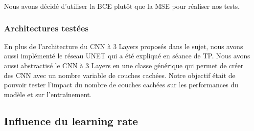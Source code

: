 \documentclass{name}
\begin{document}
Nous avons décidé d'utiliser la BCE plutôt que la MSE pour réaliser nos tests.

\subsubsection{Architectures testées}
En plus de l'architecture du CNN à 3 Layers proposés dans le sujet, nous avons aussi implémenté le réseau UNET qui a été expliqué en séance de TP.
Nous avons aussi abstractisé le CNN à 3 Layers en une classe générique qui permet de créer des CNN avec un nombre variable de couches cachées.
Notre objectif était de pouvoir tester l'impact du nombre de couches cachées sur les performances du modèle et sur l'entraînement.

\subsection{Influence du learning rate}
\end{document}
